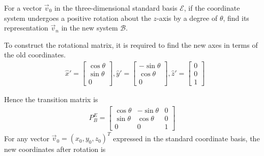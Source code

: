 \begin{exmp}
For a vector $\vec{v}_0$ in the three-dimensional standard basis $\mathcal{E}$, if the coordinate system undergoes a positive rotation about the $z$-axis by a degree of $\theta$, find its representation $\vec{v}_n$ in the new system $\mathcal{B}$.
\end{exmp}
\begin{solution}
To construct the rotational matrix, it is required to find the new axes in terms of the old coordinates.
\begin{align*}
& \hat{x}' =
\begin{bmatrix}
\cos \theta \\
\sin \theta \\
0
\end{bmatrix},
\hat{y}' =
\begin{bmatrix}
-\sin \theta \\
\cos \theta \\
0
\end{bmatrix},
\hat{z}' =
\begin{bmatrix}
0 \\
0 \\
1
\end{bmatrix}
\end{align*}
\begin{center}
\end{center}
Hence the transition matrix is
\begin{align*}
P_B^E =
\begin{bmatrix}
\cos \theta & -\sin \theta & 0 \\
\sin \theta & \cos \theta & 0 \\
0 & 0 & 1
\end{bmatrix}
\end{align*}
For any vector $\vec{v}_0 = (x_0,y_0,z_0)^T$ expressed in the standard coordinate basis, the new coordinates after rotation is

\end{solution}
